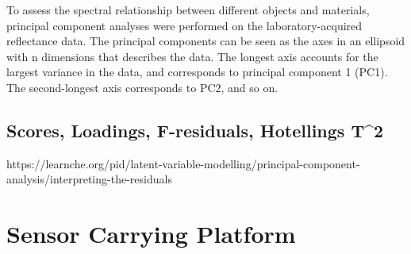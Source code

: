 \begin{figure}[H]
  \begin{minipage}{\wd\FigBox}
    \centering\usebox{\FigBox}
  \end{minipage}\hspace*{\FigHSkip}
  \label{head}
\end{figure}



To assess the spectral relationship between different objects and materials, principal component analyses were performed on the laboratory-acquired reflectance data. The principal components can be seen as the axes in an ellipsoid with n dimensions that describes the data. The longest axis accounts for the largest variance in the data, and corresponds to principal component 1 (PC1). The second-longest axis corresponds to PC2, and so on.

\subsection{Scores, Loadings, F-residuals, Hotellings T^2 }
https://learnche.org/pid/latent-variable-modelling/principal-component-analysis/interpreting-the-residuals

\section{Sensor Carrying Platform}







